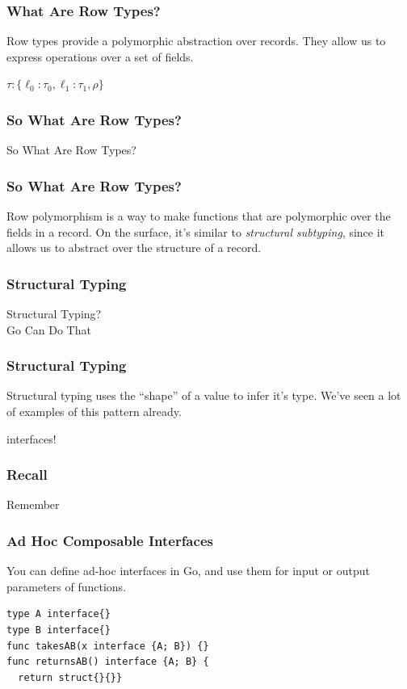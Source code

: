 \documentclass{beamer}
\newcommand{\hugecenter}[1]{\begin{center}\begin{huge}#1\end{huge}\end{center}}
\begin{document}
\begin{frame}[fragile]
  \frametitle{What Are Row Types?}
  Row types provide a polymorphic abstraction over records.  They
  allow us to express operations over a set of fields.
  \pause
  \begin{huge}
    \begin{center}
  \begin{math}
    \tau : \{ \ell_0 : \tau_0, \ell_1 : \tau_1, \rho \}
  \end{math}
\end{center}
\end{huge}
\end{frame}

\begin{frame}
  \frametitle{So What Are Row Types?}
  \hugecenter{So What Are Row Types?}
\end{frame}

\begin{frame}
  \frametitle{So What Are Row Types?}
  Row polymorphism is a way to make functions that are polymorphic
  over the fields in a record.  On the surface, it's similar to {\it
    structural subtyping}, since it allows us to abstract over the
  structure of a record.
\end{frame}

\begin{frame}
  \frametitle{Structural Typing}
  \hugecenter{Structural Typing?\\ Go Can Do That}
\end{frame}

\begin{frame}
  \frametitle{Structural Typing}
  Structural typing uses the ``shape'' of a value to infer it's type.
  We've seen a lot of examples of this pattern already.
  \pause
  \hugecenter{interfaces!}
\end{frame}

\begin{frame}
  \frametitle{Recall}
  \hugecenter{Remember}
\end{frame}

\begin{frame}[fragile]
  \frametitle{Ad Hoc Composable Interfaces}
  You can define ad-hoc interfaces in Go, and use them for input or
  output parameters of functions.
  \pause
\begin{lstlisting}[language=Golang]
type A interface{}
type B interface{}
func takesAB(x interface {A; B}) {}
func returnsAB() interface {A; B} {
  return struct{}{}}
\end{lstlisting}
\end{frame}
\end{document}
